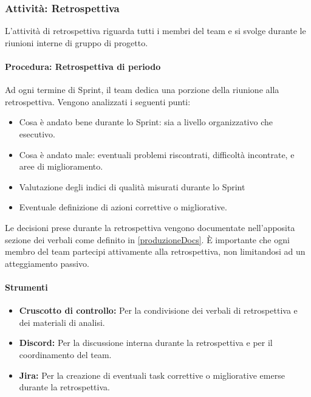 \documentclass[a4paper,12pt]{article}
\begin{document}
\subsubsection{Attività: Retrospettiva}
L'attività di retrospettiva riguarda tutti i membri del team e si svolge
durante le riunioni interne di gruppo di progetto.
\paragraph{Procedura: Retrospettiva di periodo}
Ad ogni termine di Sprint, il team dedica una porzione della riunione alla
retrospettiva. Vengono analizzati i seguenti punti:
\begin{itemize}
    \item Cosa è andato bene durante lo Sprint: sia a livello organizzativo che
          esecutivo.
    \item Cosa è andato male: eventuali problemi riscontrati, difficoltà incontrate,
          e aree di miglioramento.
    \item Valutazione degli indici di qualità misurati durante lo Sprint
    \item Eventuale definizione di azioni correttive o migliorative.
\end{itemize}
Le decisioni prese durante la retrospettiva vengono documentate nell'apposita sezione dei verbali come definito in \ref{produzioneDocs}. È importante
che ogni membro del team partecipi attivamente alla retrospettiva, non limitandosi ad un atteggiamento passivo.

\paragraph{Strumenti}
\begin{itemize}
    \item \textbf{Cruscotto di controllo:} Per la condivisione dei verbali di retrospettiva e dei materiali di analisi.
    \item \textbf{Discord:} Per la discussione interna durante la retrospettiva e per il coordinamento del team.
    \item \textbf{Jira:} Per la creazione di eventuali task correttive o migliorative emerse durante la retrospettiva.
\end{itemize}
\end{document}
